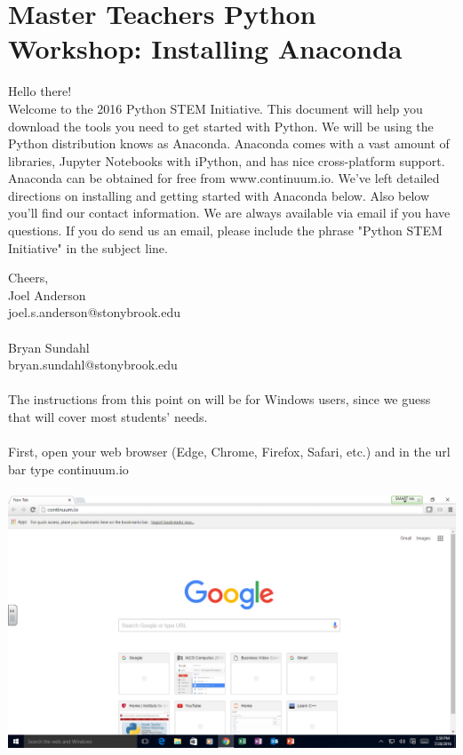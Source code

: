 \documentclass[]{article}
\begin{document}
\section*{Master Teachers Python Workshop: Installing Anaconda}
Hello there! \\

Welcome to the 2016 Python STEM Initiative. This document will help you download the tools you need to get started with Python. We will be using the Python distribution knows as Anaconda. Anaconda comes with a vast amount of libraries, Jupyter Notebooks with iPython, and has nice cross-platform support. Anaconda can be obtained for free from www.continuum.io. We've left detailed directions on installing and getting started with Anaconda below. Also below you'll find our contact information. We are always available via email if you have questions. If you do send us an email, please include the phrase "Python STEM Initiative" in the subject line.

Cheers, \\

Joel Anderson \\
joel.s.anderson@stonybrook.edu\\ \\

Bryan Sundahl \\
bryan.sundahl@stonybrook.edu

\paragraph{}
The instructions from this point on will be for Windows users, since we guess that will cover most students' needs.
\paragraph{}
First, open your web browser (Edge, Chrome, Firefox, Safari, etc.) and in the url bar type continuum.io
\paragraph{}
\begin{centering}
    \centerline{\includegraphics[scale=0.35]{Screenshot_1.png}}
\end{centering}
\end{document}
